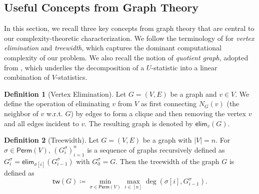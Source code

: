 \documentclass[12pt]{article}
\theoremstyle{plain}
\theoremstyle{definition}
\newtheorem{definition}{Definition}
\newcommand{\sPi}{\pi}
\newcommand{\sper}{\sigma}
\newcommand{\perm}[1]{\mathsf{Perm}(#1)}
\newcommand{\partition}{\Pi}
\newcommand{\partitionp}[1]{\partition_{#1}}
\newcommand{\degp}[2]{\deg(#1,#2)}
\newcommand{\neighborvg}[2]{N_{#2}(#1)}
\newcommand{\treewidthp}[1]{\mathsf{tw}(#1)}
\newcommand{\eliminatevg}[2]{\mathsf{elim}_{#1}(#2)}
\begin{document}
\begin{bibunit}[agsm]
\subsection{Useful Concepts from Graph Theory}
\label{sec:graph}

In this section, we recall three key concepts from graph theory that are central 
to our complexity-theoretic characterization. We follow the terminology of 
\citet{bodlaender2010treewidth} for \emph{vertex elimination} and \emph{treewidth}, 
which captures the dominant computational complexity of our problem. 
We also recall the notion of \emph{quotient graph}, adopted from 
\citet{sanders2012high}, which underlies the decomposition of a $U$-statistic 
into a linear combination of $V$-statistics.

\begin{definition}[Vertex Elimination]
\label{def:vertex_elimination}
Let $G = (V, E)$ be a graph and $v \in V$. We define the operation of eliminating $v$ from $V$ as first connecting $\neighborvg{v}{G}$ (the neighbor of $v$ w.r.t. $G$) by edges to form a clique and then removing the vertex $v$ and all edges incident to $v$. The resulting graph is denoted by $\eliminatevg{v}{G}$. 
\end{definition}

\begin{definition}[Treewidth]
\label{def:treewidth_elimination}
Let $G = (V, E)$ be a graph with $|V| = n$. For $\sigma \in \perm{V}$, $(G_i^{\sigma})_{i=1}^n$ is a sequence of graphs recursively defined as $G_i^\sigma = \eliminatevg{\sigma[i]}{G_{i-1}^\sigma}$ with $G_0^\sigma = G$. Then the treewidth of the graph $G$ is defined as 
\begin{equation*}
\treewidthp{G} \coloneqq \min_{\sigma \in \perm{V}} \max_{i \in [n]} \degp{\sper[i]}{G_{i-1}^\sigma}. 
\end{equation*}
\end{definition}


\end{bibunit}
\end{document}
